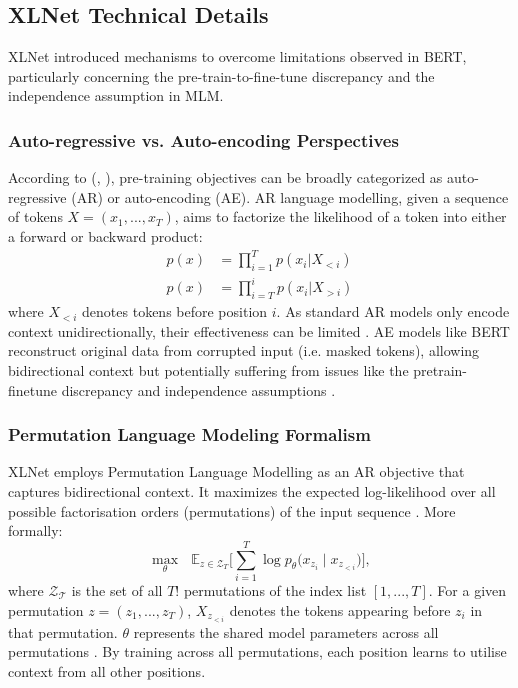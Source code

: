 \documentclass[10pt,oneside]{report}
\renewcommand{\citet}[1]{\citeauthor{#1}, \citeyear{#1}}
\begin{document}
\subsection{XLNet Technical Details}

XLNet \cite{yang2019xlnet} introduced mechanisms to overcome limitations observed in BERT, particularly concerning the pre-train-to-fine-tune discrepancy and the independence assumption in MLM.

\subsubsection*{Auto-regressive vs. Auto-encoding Perspectives}
According to (\citet{yang2019xlnet}), pre-training objectives can be broadly categorized as auto-regressive (AR) or auto-encoding (AE). AR language modelling, given a sequence of tokens $X = (x_1, ..., x_T)$, aims to factorize the likelihood of a token into either a forward or backward product:
\begin{align}
    p(x) &= \prod_{i=1}^{T} p(x_i | X_{<i}) \label{eq:fwdprod_appendix} \\ %
    p(x) &= \prod_{i=T}^{i} p(x_i | X_{>i}) \label{eq:bckprod_appendix} %
\end{align}
where $X_{<i}$ denotes tokens before position $i$. As standard AR models only encode context unidirectionally, their effectiveness can be limited \cite{yang2019xlnet}. AE models like BERT reconstruct original data from corrupted input (i.e. masked tokens), allowing bidirectional context but potentially suffering from issues like the pretrain-finetune discrepancy and independence assumptions \cite{yang2019xlnet}.

\subsubsection*{Permutation Language Modeling Formalism}
XLNet employs Permutation Language Modelling as an AR objective that captures bidirectional context. It maximizes the expected log-likelihood over all possible factorisation orders (permutations) of the input sequence \cite{yang2019xlnet}. More formally:
\begin{equation}
    \max_{\theta} \text{  } \mathbb{E}_{z\in\mathcal{Z}_T} \bigl[ \sum_{i=1}^{T} \log p_{\theta} \bigl(x_{z_i}\mid x_{z_{<i}}\bigr) \bigr], \label{eq:plm_appendix} %
\end{equation}
where $\mathcal{Z_T}$ is the set of all $T!$ permutations of the index list $[1, ... , T]$. For a given permutation $z = (z_1, ..., z_T)$, $X_{z_{<i}}$ denotes the tokens appearing before $z_i$ in that permutation. $\theta$ represents the shared model parameters across all permutations \cite{yang2019xlnet}. By training across all permutations, each position learns to utilise context from all other positions.
\end{document}
